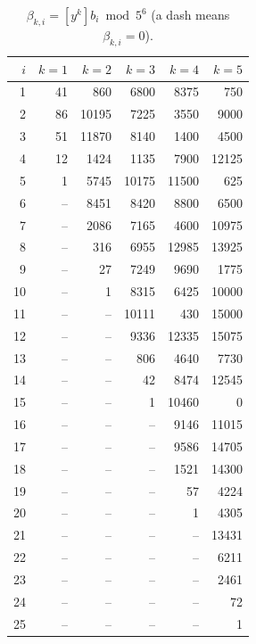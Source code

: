 \documentclass[11pt]{article}
\theoremstyle{definition}
\theoremstyle{remark}
\numberwithin{equation}{section}
\begin{document}
\begin{table}[H]
\centering\small
\caption{$\beta_{k,i}=[y^k]b_i \bmod 5^6$ (a dash means $\beta_{k,i}=0$).}\label{tab:beta}
\begin{tabular}{r|rrrrr}
$i$ & $k=1$ & $k=2$ & $k=3$ & $k=4$ & $k=5$\\\hline
1 & 41 & 860 & 6800 & 8375 & 750 \\
2 & 86 & 10195 & 7225 & 3550 & 9000 \\
3 & 51 & 11870 & 8140 & 1400 & 4500 \\
4 & 12 & 1424 & 1135 & 7900 & 12125 \\
5 & 1 & 5745 & 10175 & 11500 & 625 \\
6 & -- & 8451 & 8420 & 8800 & 6500 \\
7 & -- & 2086 & 7165 & 4600 & 10975 \\
8 & -- & 316 & 6955 & 12985 & 13925 \\
9 & -- & 27 & 7249 & 9690 & 1775 \\
10 & -- & 1 & 8315 & 6425 & 10000 \\
11 & -- & -- & 10111 & 430 & 15000 \\
12 & -- & -- & 9336 & 12335 & 15075 \\
13 & -- & -- & 806 & 4640 & 7730 \\
14 & -- & -- & 42 & 8474 & 12545 \\
15 & -- & -- & 1 & 10460 & 0 \\
16 & -- & -- & -- & 9146 & 11015 \\
17 & -- & -- & -- & 9586 & 14705 \\
18 & -- & -- & -- & 1521 & 14300 \\
19 & -- & -- & -- & 57 & 4224 \\
20 & -- & -- & -- & 1 & 4305 \\
21 & -- & -- & -- & -- & 13431 \\
22 & -- & -- & -- & -- & 6211 \\
23 & -- & -- & -- & -- & 2461 \\
24 & -- & -- & -- & -- & 72 \\
25 & -- & -- & -- & -- & 1 \\
\end{tabular}
\end{table}
\end{document}
